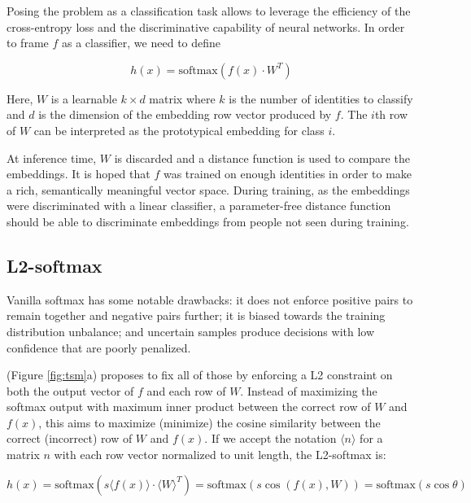 Posing the problem as a classification task allows to leverage the efficiency of the cross-entropy loss and the discriminative capability of neural networks. In order to frame $f$ as a classifier, we need to define

\begin{equation}
    h(x) = \text{softmax}(f(x) \cdot W^T)
\end{equation}

Here, $W$ is a learnable $k\times d$ matrix where $k$ is the number of identities to classify and $d$ is the dimension of the embedding row vector produced by $f$. The $i$th row of $W$ can be interpreted as the prototypical embedding for class $i$.

At inference time, $W$ is discarded and a distance function is used to compare the embeddings. It is hoped that $f$ was trained on enough identities in order to make a rich, semantically meaningful vector space. During training, as the embeddings were discriminated with a linear classifier, a parameter-free distance function should be able to discriminate embeddings from people not seen during training.

\subsection{L2-softmax}
\newcommand{\vnorm}[1]{\langle #1 \rangle}

Vanilla softmax has some notable drawbacks: it does not enforce positive pairs to remain together and negative pairs further; it is biased towards the training distribution unbalance; and uncertain samples produce decisions with low confidence that are poorly penalized.

\citet{l2softmax} (Figure \ref{fig:tsm}a) proposes to fix all of those by enforcing a L2 constraint on both the output vector of $f$ and each row of $W$. Instead of maximizing the softmax output with maximum inner product between the correct row of $W$ and $f(x)$, this aims to maximize (minimize) the cosine similarity between the correct (incorrect) row of $W$ and $f(x)$. If we accept the notation $\vnorm{n}$ for a matrix $n$ with each row vector normalized to unit length, the L2-softmax is:

\begin{equation}
    \label{eq:l2sm}
    h(x) = \text{softmax}(s \vnorm{f(x)} \cdot \vnorm{W}^T ) = \text{softmax}(s \cos(f(x), W)) = \text{softmax}(s \cos \theta)
\end{equation}

